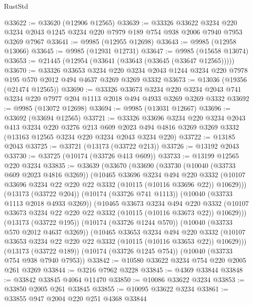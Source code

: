 \begin{lexlean}{RustStd}
\begin{coremodule}
@33622 := @33620 (@12906 @12565)
@33639 := @33326
    @33622
    @3234
    @220
    @3234
    @2043
    @1245
    @3234
    @220
    @7979
    @189
    @754
    @938
    @2006
    @7940
    @7953
    @3269
    @7967
@33641 := @9985 (@12955 @12698)
@33643 := @9985 (@12958 @13066)
@33645 := @9985 (@12931 @12731)
@33647 := @9985 (@15658 @13074)
@33653 := @21445 (@12954 (@33641 (@33643 (@33645 (@33647 @12565)))))
@33670 := @33326
    @33653
    @3234
    @220
    @3234
    @2043
    @1244
    @3234
    @220
    @7978
    @195
    @570
    @2012
    @494
    @4637
    @3269
    @3269
    @3332
@33673 := @13036 (@19356 (@21474 @12565))
@33690 := @33326
    @33673
    @3234
    @220
    @3234
    @2043
    @741
    @3234
    @220
    @7977
    @204
    @1113
    @2018
    @494
    @4933
    @3269
    @3269
    @3332
@33692 := @9985 (@13072 @12698)
@33694 := @9985 (@13031 @12667)
@33696 := @33692 (@33694 @12565)
@33721 := @33326
    @33696
    @3234
    @220
    @3234
    @2043
    @413
    @3234
    @220
    @3276
    @213
    @609
    @2023
    @494
    @4816
    @3269
    @3269
    @3332
    (@13163 @12565 @3234 @220 @3234 @2043 @3234 @220)
@33722 := @13185 @2043
@33725 := @33721 (@13173 (@33722 @213))
@33726 := @13192 @2043
@33730 := @33725 (@10174 (@33726 @413 @609))
@33733 := @13199 @12565 @220 @3234
@33835 := @33639
    (@33670
      (@33690
        (@33730
          (@10040 (@33733 @609 @2023 @4816 @3269))
          (@10465
            @33696
            @3234
            @494
            @220
            @3332
            (@10107 @33696 @3234 @22 @220 @22 @3332 (@10115 (@10116 @33696 @22)) @10629)))
        (@13173 (@33722 @204))
        (@10174 (@33726 @741 @1113))
        (@10040 (@33733 @1113 @2018 @4933 @3269))
        (@10465
          @33673
          @3234
          @494
          @220
          @3332
          (@10107 @33673 @3234 @22 @220 @22 @3332 (@10115 (@10116 @33673 @22)) @10629)))
      (@13173 (@33722 @195))
      (@10174 (@33726 @1244 @570))
      (@10040 (@33733 @570 @2012 @4637 @3269))
      (@10465
        @33653
        @3234
        @494
        @220
        @3332
        (@10107 @33653 @3234 @22 @220 @22 @3332 (@10115 (@10116 @33653 @22)) @10629)))
    (@13173 (@33722 @189))
    (@10174 (@33726 @1245 @754))
    (@10040 (@33733 @754 @938 @7940 @7953))
@33842 := @10580 @33622 @3234 @754 @220 @2005 @261 @3269
@33844 := @3216 @7962 @3228
@33845 := @4369 @33844
@33848 := @33842 @33845 @4064 @11470
@33850 := @10086 @33622 @3234
@33853 := @33850 @2005 @261 @33845
@33855 := @10095 @33622 @3234
@33861 := @33855 @947 @2004 @220 @251 @4368 @33844

\end{coremodule}
\end{lexlean}
